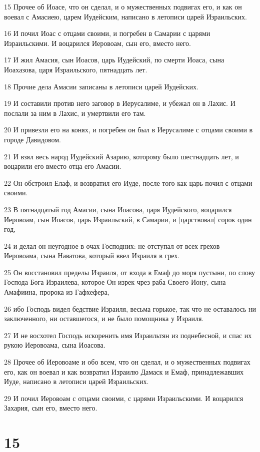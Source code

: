 \par 15 Прочее об Иоасе, что он сделал, и о мужественных подвигах его, и как он воевал с Амасиею, царем Иудейским, написано в летописи царей Израильских.
\par 16 И почил Иоас с отцами своими, и погребен в Самарии с царями Израильскими. И воцарился Иеровоам, сын его, вместо него.
\par 17 И жил Амасия, сын Иоасов, царь Иудейский, по смерти Иоаса, сына Иоахазова, царя Израильского, пятнадцать лет.
\par 18 Прочие дела Амасии записаны в летописи царей Иудейских.
\par 19 И составили против него заговор в Иерусалиме, и убежал он в Лахис. И послали за ним в Лахис, и умертвили его там.
\par 20 И привезли его на конях, и погребен он был в Иерусалиме с отцами своими в городе Давидовом.
\par 21 И взял весь народ Иудейский Азарию, которому было шестнадцать лет, и воцарили его вместо отца его Амасии.
\par 22 Он обстроил Елаф, и возвратил его Иуде, после того как царь почил с отцами своими.
\par 23 В пятнадцатый год Амасии, сына Иоасова, царя Иудейского, воцарился Иеровоам, сын Иоасов, царь Израильский, в Самарии, и [царствовал] сорок один год,
\par 24 и делал он неугодное в очах Господних: не отступал от всех грехов Иеровоама, сына Наватова, который ввел Израиля в грех.
\par 25 Он восстановил пределы Израиля, от входа в Емаф до моря пустыни, по слову Господа Бога Израилева, которое Он изрек чрез раба Своего Иону, сына Амафиина, пророка из Гафхефера,
\par 26 ибо Господь видел бедствие Израиля, весьма горькое, так что не оставалось ни заключенного, ни оставшегося, и не было помощника у Израиля.
\par 27 И не восхотел Господь искоренить имя Израильтян из поднебесной, и спас их рукою Иеровоама, сына Иоасова.
\par 28 Прочее об Иеровоаме и обо всем, что он сделал, и о мужественных подвигах его, как он воевал и как возвратил Израилю Дамаск и Емаф, принадлежавших Иуде, написано в летописи царей Израильских.
\par 29 И почил Иеровоам с отцами своими, с царями Израильскими. И воцарился Захария, сын его, вместо него.

\chapter{15}


